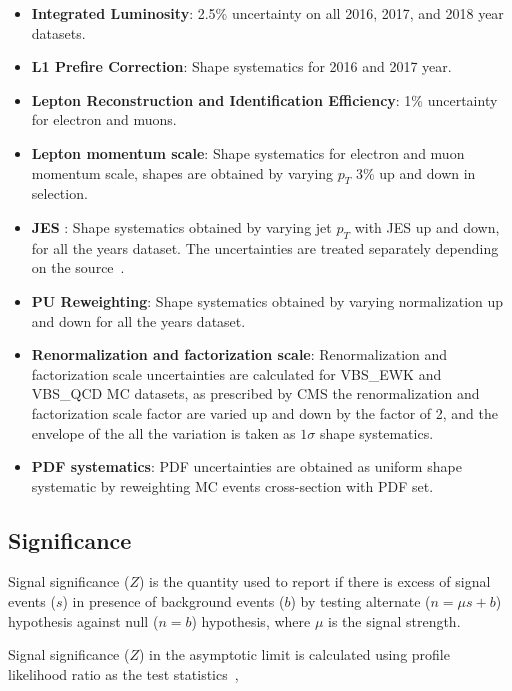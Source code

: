 \begin{itemize}
  \item \textbf{Integrated Luminosity}: 2.5\%
        uncertainty on all 2016, 2017, and 2018
        year datasets.
  \item \textbf{L1 Prefire Correction}: Shape systematics for 2016 and 2017
        year.
  \item \textbf{Lepton Reconstruction and Identification Efficiency}: 1\%
        uncertainty for electron and muons.
  \item \textbf{Lepton momentum scale}: Shape systematics for electron
        and muon momentum scale, shapes are obtained by varying \(p_T\) 3\% up and
        down in selection.
  \item \textbf{\gls{JES} }: Shape systematics
        obtained by varying jet \( p_T \) with \gls{JES} up and down,
        for all the years dataset. The uncertainties
        are treated separately depending on the source~\cite{CMS-DP-2020-019}.
  \item \textbf{PU Reweighting}: Shape systematics
        obtained by varying normalization up and down for all the years dataset.
  \item \textbf{Renormalization and factorization scale}:
        Renormalization and factorization scale uncertainties
        are calculated for VBS\_EWK and VBS\_QCD \gls{MC} datasets,
        as prescribed by \gls{CMS} the renormalization and factorization
        scale factor are varied up and down by the factor of 2,
        and the envelope of the all the variation is taken as \( 1\sigma \)
        shape systematics.
  \item \textbf{PDF systematics}: \gls{PDF} uncertainties
        are obtained as uniform shape systematic by reweighting \gls{MC} events cross-section
        with \gls{PDF} set.
\end{itemize}

\subsection{
  Significance
}

Signal significance (\( Z \)) is
the quantity used to report if there is excess of signal events (\( s \)) in
presence of background events (\( b \)) by testing alternate (\( n = \mu s + b \)) hypothesis
against null (\( n = b \)) hypothesis, where \( \mu \) is the signal strength.

Signal significance (\( Z \)) in the asymptotic limit
is calculated using profile likelihood ratio as the test statistics~\cite{Cowan2010},

